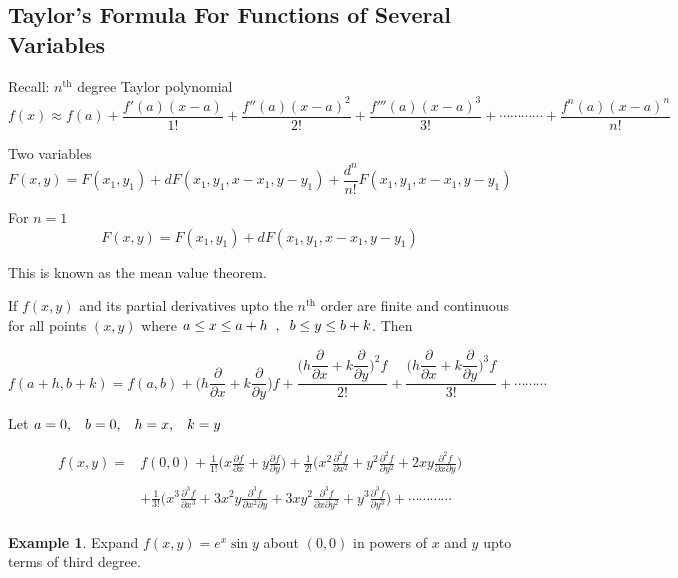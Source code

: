 \documentclass[11pt,a4paper]{article}
\theoremstyle{definition}
\newtheorem{exa}[thm]{Example}
\begin{document}
{\color[wave]{485}\subsection{Taylor's Formula For Functions of Several Variables}}

Recall: $n^{\text{th}}$ degree Taylor polynomial $$f(x) \approx f(a) + \frac{f'(a)(x-a)}{1!}+ \frac{f''(a)(x-a)^2}{2!}+ \frac{f'''(a)(x-a)^3}{3!}+ \cdots\cdots\cdots\cdots + \frac{f^n(a)(x-a)^n}{n!}$$


Two variables
$$F(x,y) = F(x_1,y_1) + dF(x_1,y_1,x-x_1,y-y_1) + \frac{d^n}{n!}F(x_1,y_1,x-x_1,y-y_1)$$

For $n = 1$
$$F(x,y) = F(x_1,y_1) + dF(x_1,y_1,x-x_1,y-y_1)$$

This is known as the mean value theorem.


If $f(x,y)$ and its partial derivatives upto the $n^{\text{th}}$ order are finite and continuous for all points $(x,y)$ where $a\leq x\leq  a+h\hspace{0.2cm},\hspace{0.2cm} b\leq y \leq b + k$. Then 

$$f(a+h,b+k) = f(a,b) + \bigg(h\frac{\partial}{\partial x} + k \frac{\partial}{\partial y}\bigg) f + \frac{\bigg(h\dfrac{\partial}{\partial x} + k \dfrac{\partial}{\partial y}\bigg)^2f}{2!} + \frac{\bigg(h\dfrac{\partial}{\partial x} + k \dfrac{\partial}{\partial y}\bigg)^3 f}{3!} + \cdots\cdots\cdots 
$$

Let $a=0,\hspace{0.3cm} b = 0,\hspace{0.3cm} h=x,\hspace{0.3cm} k = y$

\begin{align*}
f(x,y) = & f(0,0) + \frac{1}{1!}\bigg(x\frac{\partial f}{\partial x} + y \frac{\partial f}{\partial y}\bigg) 
+\frac{1}{2!}\bigg(x^2\frac{\partial^2 f}{\partial x^2} + y^2\frac{\partial^2f}{\partial y^2} +2xy\frac{\partial^2f}{\partial x\partial y}\bigg)\\\\ & + \frac{1}{3!}      
\bigg(x^3\frac{\partial^3f}{\partial x^3} + 3x^2y \frac{\partial^3f}{\partial x^2\partial y} + 3xy^2\frac{\partial^3f}{\partial x\partial y^2} + y^3 \frac{\partial^3f}{\partial y^3}\bigg) +\cdots\cdots\cdots\cdots\\
\end{align*}

\begin{exa}


Expand $f(x,y) = e^x \sin y$ about $(0,0)$ in powers of $x$ and $y$ upto terms of third degree.
\end{exa}
\end{document}
